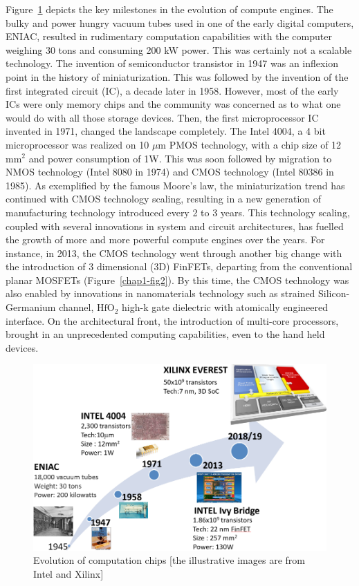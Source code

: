 \begin{multicols}{2}
Figure~\ref{chap1-fig1} depicts  the key milestones in the evolution of compute engines. The bulky and power hungry vacuum tubes used in one of the early digital computers, ENIAC, resulted in rudimentary computation capabilities with the computer weighing 30 tons and consuming 200 kW power. This was certainly not a scalable technology. The invention of semiconductor transistor in 1947 was an inflexion point in the history of miniaturization. This was followed by the invention of the first integrated circuit (IC), a decade later in 1958. However, most of the early ICs were only memory chips and the community was concerned as to what one would do with all those storage devices. Then, the first microprocessor IC invented in 1971,  changed the landscape completely. The Intel 4004, a 4 bit microprocessor was realized on 10 $\mu\mbox{m}$ PMOS technology, with a chip size of 12 $\text{mm}^2$ and power consumption of 1W. This was soon followed by migration to  NMOS technology (Intel 8080 in 1974) and CMOS technology (Intel 80386 in 1985).  As exemplified by the famous Moore’s law, the miniaturization trend has continued with CMOS technology scaling, resulting in a new generation of manufacturing technology introduced every 2 to 3 years. This technology scaling,  coupled with several innovations in system and circuit architectures, has fuelled the growth of more and more powerful compute engines over the years. For instance, in 2013, the CMOS technology went through another big change with the introduction of 3 dimensional (3D) FinFETs, departing from the conventional planar MOSFETs (Figure~\ref{chap1-fig2}). By this time, the CMOS technology was also enabled by innovations in nanomaterials technology such as strained Silicon-Germanium channel, $\mbox{HfO}_2$ high-k gate dielectric with atomically engineered interface. On the architectural front, the introduction of multi-core processors, brought in an unprecedented computing capabilities, even to the hand held devices.  
\setcounter{figure}{0}
\begin{figure}[H]
\centering
\includegraphics[scale=1.1]{src/Figures/chap1/chap1-fig01.jpg}
\caption{Evolution of computation chips [the illustrative images are from Intel and Xilinx]}\label{chap1-fig1}
\end{figure}


\end{multicols}

